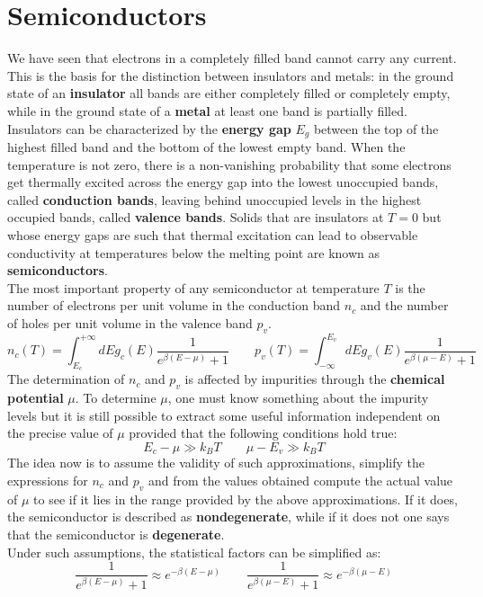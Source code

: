 \documentclass[10.75pt,a4paper,openright,bottom=2cm]{article}
\begin{document}
\section{Semiconductors}
We have seen that electrons in a completely filled band cannot carry any current. This is the basis for the distinction between insulators and metals: in the ground state of an \textbf{insulator} all bands are either completely filled or completely empty, while in the ground state of a \textbf{metal} at least one band is partially filled. Insulators can be characterized by the \textbf{energy gap} $E_g$ between the top of the highest filled band and the bottom of the lowest empty band. When the temperature is not zero, there is a non-vanishing probability that some electrons get thermally excited across the energy gap into the lowest unoccupied bands, called \textbf{conduction bands}, leaving behind unoccupied levels in the highest occupied bands, called \textbf{valence bands}. Solids that are insulators at $T=0$ but whose energy gaps are such that thermal excitation can lead to observable conductivity at temperatures below the melting point are known as \textbf{semiconductors}.\\
The most important property of any semiconductor at temperature $T$ is the number of electrons per unit volume in the conduction band $n_c$ and the number of holes per unit volume in the valence band $p_v$.
\[
n_c(T)=\int_{E_c}^{+\infty} dEg_c(E)\frac{1}{e^{\beta(E-\mu)}+1} \qquad p_v(T)=\int_{-\infty}^{E_v}dEg_v(E)\frac{1}{e^{\beta(\mu-E)}+1}
\]
The determination of $n_c$ and $p_v$ is affected by impurities through the \textbf{chemical potential} $\mu$. To determine $\mu$, one must know something about the impurity levels but it is still possible to extract some useful information independent on the precise value of $\mu$ provided that the following conditions hold true:
\begin{equation}
\label{nondeg}
E_c-\mu\gg k_BT \qquad \mu-E_v\gg k_BT
\end{equation}
The idea now is to assume the validity of such approximations, simplify the expressions for $n_c$ and $p_v$ and from the values obtained compute the actual value of $\mu$ to see if it lies in the range provided by the above approximations. If it does, the semiconductor is described as \textbf{nondegenerate}, while if it does not one says that the semiconductor is \textbf{degenerate}.\\
Under such assumptions, the statistical factors can be simplified as:
\[
\frac{1}{e^{\beta(E-\mu)}+1}\approx e^{-\beta(E-\mu)} \qquad \frac{1}{e^{\beta(\mu-E)}+1}\approx e^{-\beta(\mu-E)}
\]
\end{document}
